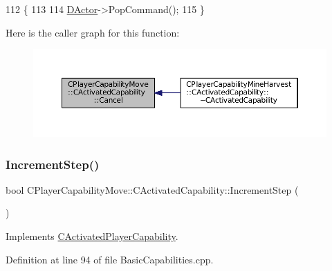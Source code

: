 \begin{DoxyCode}
112                                                       \{
113 
114     \hyperlink{classCActivatedPlayerCapability_a54ca944b47bff2718330639941d402b0}{DActor}->PopCommand();
115 \}
\end{DoxyCode}
Here is the caller graph for this function\+:\nopagebreak
\begin{figure}[H]
\begin{center}
\leavevmode
\includegraphics[width=350pt]{classCPlayerCapabilityMove_1_1CActivatedCapability_a6fe1e26646bd14e94ebf7abd0a41cdd3_icgraph}
\end{center}
\end{figure}
\hypertarget{classCPlayerCapabilityMove_1_1CActivatedCapability_af4670890b462f59d24195db14aeb436d}{}\label{classCPlayerCapabilityMove_1_1CActivatedCapability_af4670890b462f59d24195db14aeb436d} 
\subsubsection{\texorpdfstring{Increment\+Step()}{IncrementStep()}}
{\footnotesize\ttfamily bool C\+Player\+Capability\+Move\+::\+C\+Activated\+Capability\+::\+Increment\+Step (\begin{DoxyParamCaption}{ }\end{DoxyParamCaption})\hspace{0.3cm}{\ttfamily [virtual]}}



Implements \hyperlink{classCActivatedPlayerCapability_a943b5999a57504399293250382c0ec6a}{C\+Activated\+Player\+Capability}.



Definition at line 94 of file Basic\+Capabilities.\+cpp.


